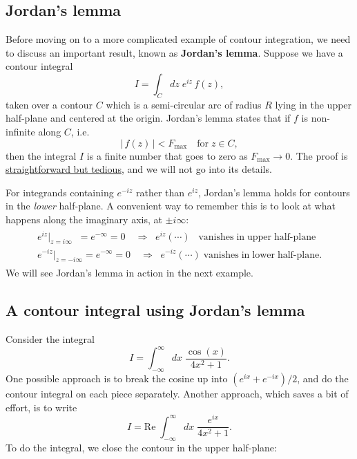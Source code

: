 \documentclass[10pt,a4paper]{article}
\begin{document}
\subsection{Jordan's lemma}
\label{jordans_lemma}

Before moving on to a more complicated example of contour integration,
we need to discuss an important result, known as \textbf{Jordan's
  lemma}. Suppose we have a contour integral
\begin{equation}
  I = \int_C dz \; e^{iz} \,f(z),
\end{equation}
taken over a contour $C$ which is a semi-circular arc of radius $R$
lying in the upper half-plane and centered at the origin. Jordan's
lemma states that if $f$ is non-infinite along $C$, i.e.
\begin{equation}
  \big|\,f(z)\,\big| < F_{\mathrm{max}} \quad\mathrm{for}\;z \in C,
\end{equation}
then the integral $I$ is a finite number that goes to zero as
$F_{\mathrm{max}} \rightarrow 0$. The proof is
\href{http://en.wikipedia.org/wiki/Jordan\%27s_lemma}{straightforward
  but tedious}, and we will not go into its details.

For integrands containing $e^{-iz}$ rather than $e^{iz}$, Jordan's
lemma holds for contours in the \emph{lower} half-plane. A convenient
way to remember this is to look at what happens along the imaginary
axis, at $\pm i\infty$:
\begin{align}
  \begin{aligned}
e^{iz}|_{z = i\infty}\;\; = e^{-\infty} = 0\quad \Rightarrow \;\; e^{iz} (\cdots) \;\;\;\textrm{vanishes}\;\textrm{in}\;\textrm{upper}\;\textrm{half-plane} \\
e^{-iz}|_{z = -i\infty} = e^{-\infty} = 0\quad \Rightarrow \;\; e^{-iz} (\cdots) \;\textrm{vanishes}\;\textrm{in}\;\textrm{lower}\;\textrm{half-plane}.
  \end{aligned}
\end{align}
We will see Jordan's lemma in action in the next example.

\subsection{A contour integral using Jordan's lemma}

Consider the integral
\begin{equation}
  I = \int_{-\infty}^\infty dx\; \frac{\cos(x)}{4x^2 + 1}.
\end{equation}
One possible approach is to break the cosine up into $(e^{ix} +
e^{-ix})/2$, and do the contour integral on each piece
separately. Another approach, which saves a bit of effort, is to write
\begin{equation}
  I = \mathrm{Re} \; \int_{-\infty}^\infty dx\; \frac{e^{ix}}{4x^2 + 1}.
\end{equation}
To do the integral, we close the contour in the upper half-plane:
\end{document}
